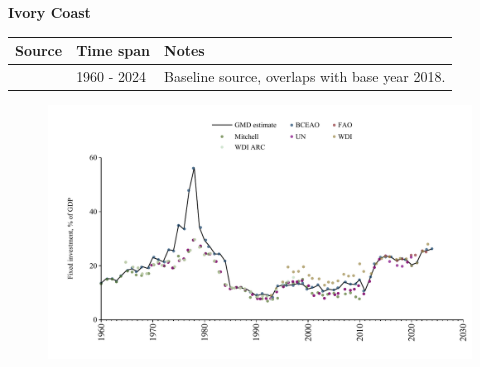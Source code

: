 \documentclass[12pt,a4paper,landscape]{article}
\begin{document}
\begin{adjustbox}{max totalsize={\paperwidth}{\paperheight},center}
\begin{minipage}[t][\textheight][t]{\textwidth}
\vspace*{0.5cm}
{}
\begin{center}
{\Large\bfseries Ivory Coast}
\end{center}
\vspace{0.5cm}
\begin{table}[H]
\centering
\small
\begin{tabular}{|l|l|l|}
\hline
\textbf{Source} & \textbf{Time span} & \textbf{Notes} \\
\hline
\rowcolor{white}\cite{BCEAO}& 1960 - 2024 &Baseline source, overlaps with base year 2018.\\
\hline
\end{tabular}
\end{table}
\begin{figure}[H]
\centering
\includegraphics[width=\textwidth,height=0.6\textheight,keepaspectratio]{graphs/CIV_finv_GDP.pdf}
\end{figure}
\end{minipage}
\end{adjustbox}
\end{document}
